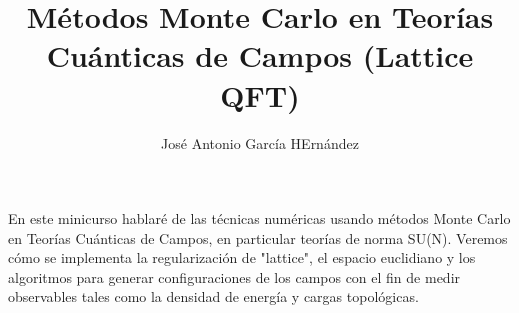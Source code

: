 \documentclass[12pt,a4paper]{article}
\author{José Antonio García HErnández}
\title{Métodos Monte Carlo en Teorías Cuánticas de Campos (Lattice QFT)}
\begin{document}
\maketitle

En este minicurso hablaré de las técnicas numéricas usando métodos Monte Carlo
en Teorías Cuánticas de Campos, en particular teorías de norma SU(N). Veremos cómo se implementa la regularización de "lattice", el espacio euclidiano y los algoritmos para generar configuraciones de los campos con el fin de medir observables tales como la densidad de energía y cargas topológicas.
\end{document}
